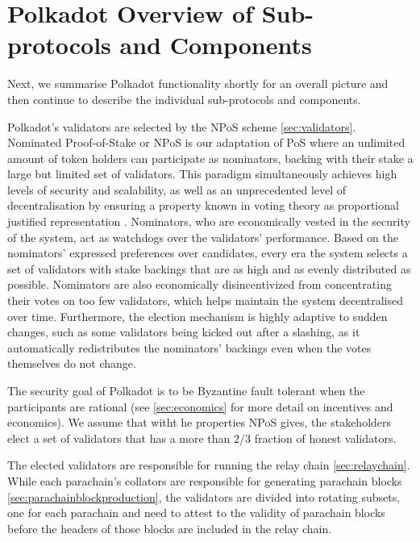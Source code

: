 \section{Polkadot Overview of Sub-protocols and Components}\label{sec:components}
Next, we summarise Polkadot functionality shortly for an overall picture and then continue to describe the individual sub-protocols and components. %

Polkadot's validators are selected by the NPoS scheme \ref{sec:validators}. Nominated Proof-of-Stake or NPoS is our adaptation of PoS where an unlimited amount of token holders can participate as nominators, backing with their stake a large but limited set of validators. This paradigm simultaneously achieves high levels of security and scalability, as well as an unprecedented level of decentralisation by ensuring a property known in voting theory as proportional justified representation \cite{sanchez2017proportional, brill2017phragmen}. Nominators, who are economically vested in the security of the system, act as watchdogs over the validators' performance. Based on the nominators' expressed preferences over candidates, every era the system selects a set of validators with stake backings that are as high and as evenly distributed as possible. Nominators are also economically disincentivized from concentrating their votes on too few validators, which helps maintain the system decentralised over time. Furthermore, the election mechanism is highly adaptive to sudden changes, such as some validators being kicked out after a slashing, as it automatically redistributes the nominators' backings even when the votes themselves do not change. 

The security goal of Polkadot is to be Byzantine fault tolerant when the participants are rational (see \ref{sec:economics} for more detail on incentives and economics). We assume that witht he properties NPoS gives, the stakeholders elect a set of validators that has a more than $2/3$ fraction of honest validators.

The elected validators are responsible for running the relay chain \ref{sec:relaychain}. While each parachain's collators are responsible for generating parachain blocks \ref{sec:parachainblockproduction}, the validators are divided into rotating subsets, one for each parachain and need to attest to the validity of parachain blocks before the headers of those blocks are included in the relay chain.


